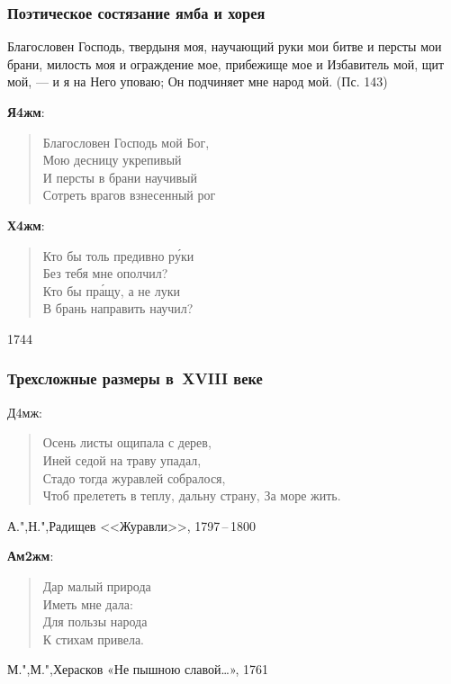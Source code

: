 \documentclass{beamer}
\begin{document}

\begin{frame}
\frametitle{Поэтическое состязание ямба и хорея}

Благословен Господь, твердыня моя, научающий руки мои битве и персты мои брани, милость моя и ограждение мое, прибежище мое и Избавитель мой, щит мой, — и я на Него уповаю; Он подчиняет мне народ мой. (Пс. 143)

\textbf{Я4жм}:
\begin{verse}
Благословен Господь мой Бог,\\
Мою десницу укрепивый\\
И персты в брани научивый\\
Сотреть врагов взнесенный рог
\end{verse}

\textbf{Х4жм}:
\begin{verse}
Кто бы толь предивно р\'{у}ки\\
Без тебя мне ополчил?\\
Кто бы пр\'{а}щу, а не луки\\
В брань направить научил?
\end{verse}
1744
\end{frame}

%
\begin{frame}
\frametitle{Трехсложные размеры в~XVIII веке}

Д4мж:
\begin{verse}
Осень листы ощипала с дерев, \\
Иней седой на траву упадал, \\
Стадо тогда журавлей собралося,\\ 
Чтоб прелететь в теплу, дальну страну, 
За море жить.
\end{verse}
А.",Н.",Радищев <<Журавли>>, 1797\,--\,1800

\begin{flushleft}
\textbf{Ам2жм}:
\end{flushleft}
\begin{verse}
Дар малый природа\\
Иметь мне дала: \\
Для пользы народа\\
К стихам привела. 
\end{verse}
М.",М.",Херасков «Не пышною славой\dots», 1761

\end{frame}
\end{document}

